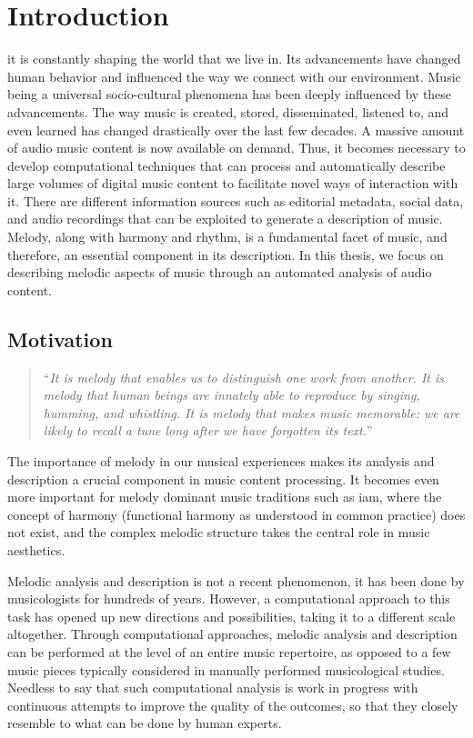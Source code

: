 \glsresetall

\chapter{Introduction}
\label{chap:intro}

\Gls{it} is constantly shaping the world that we live in. Its advancements have changed human behavior and influenced the way we connect with our environment. Music being a universal socio-cultural phenomena has been deeply influenced by these advancements. The way music is created, stored, disseminated, listened to, and even learned has changed drastically over the last few decades. A massive amount of audio music content is now available on demand. Thus, it becomes necessary to develop computational techniques that can process and automatically describe large volumes of digital music content to facilitate novel ways of interaction with it. There are different information sources such as editorial metadata, social data, and audio recordings that can be exploited to generate a description of music. Melody, along with harmony and rhythm, is a fundamental facet of music, and therefore, an essential component in its description. In this thesis, we focus on describing melodic aspects of music through an automated analysis of audio content. 

\section{Motivation}
\label{sec:motivation}

\blockcquote[]{selfridge1998conceptual}{``\textit{It is melody that enables us to distinguish one work from another. It is melody that human beings are innately able to reproduce by singing, humming, and whistling. It is melody that makes music memorable: we are likely to recall a tune long after we have forgotten its text.}''}

The importance of melody in our musical experiences makes its analysis and description a crucial component in music content processing. It becomes even more important for melody dominant music traditions such as \gls{iam}, where the concept of harmony (functional harmony as understood in common practice) does not exist, and the complex melodic structure takes the central role in music aesthetics.

Melodic analysis and description is not a recent phenomenon, it has been done by musicologists for hundreds of years. However, a computational approach to this task has opened up new directions and possibilities, taking it to a different scale altogether. Through computational approaches, melodic analysis and description can be performed at the level of an entire music repertoire, as opposed to a few music pieces typically considered in manually performed musicological studies. Needless to say that such computational analysis is work in progress with continuous attempts to improve the quality of the outcomes, so that they closely resemble to what can be done by human experts.

